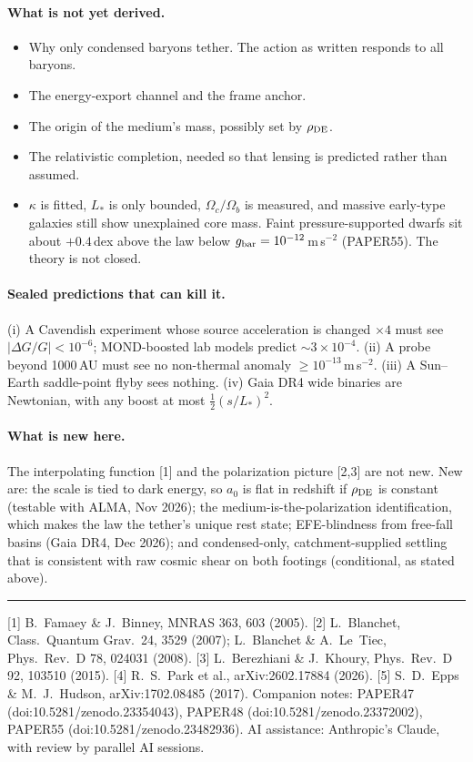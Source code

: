 \documentclass[10pt]{article}
\begin{document}
\paragraph{What is not yet derived.}
\begin{itemize}
\item Why only condensed baryons tether. The action as written responds to all baryons.
\item The energy-export channel and the frame anchor.
\item The origin of the medium's mass, possibly set by $\rho_{\rm DE}$.
\item The relativistic completion, needed so that lensing is predicted rather than assumed.
\item $\kappa$ is fitted, $L_*$ is only bounded, $\Omega_c/\Omega_b$ is measured, and massive early-type galaxies still show unexplained core mass. Faint pressure-supported dwarfs sit about $+0.4$\,dex above the law below $g_{\rm bar}=10^{-12}$\,m\,s$^{-2}$ (PAPER55). The theory is not closed.
\end{itemize}

\paragraph{Sealed predictions that can kill it.} (i) A Cavendish experiment whose source acceleration is changed $\times4$ must see $|\Delta G/G|<10^{-6}$; MOND-boosted lab models predict $\sim3\times10^{-4}$. (ii) A probe beyond 1000\,AU must see no non-thermal anomaly $\ge10^{-13}$\,m\,s$^{-2}$. (iii) A Sun--Earth saddle-point flyby sees nothing. (iv) Gaia DR4 wide binaries are Newtonian, with any boost at most $\tfrac12(s/L_*)^2$.

\paragraph{What is new here.} The interpolating function [1] and the polarization picture [2,3] are not new. New are: the scale is tied to dark energy, so $a_0$ is flat in redshift if $\rho_{\rm DE}$ is constant (testable with ALMA, Nov 2026); the medium-is-the-polarization identification, which makes the law the tether's unique rest state; EFE-blindness from free-fall basins (Gaia DR4, Dec 2026); and condensed-only, catchment-supplied settling that is consistent with raw cosmic shear on both footings (conditional, as stated above).

\vspace{4pt}\hrule\vspace{3pt}
{\footnotesize [1] B.~Famaey \& J.~Binney, MNRAS 363, 603 (2005). [2] L.~Blanchet, Class.\ Quantum Grav.\ 24, 3529 (2007); L.~Blanchet \& A.~Le~Tiec, Phys.\ Rev.\ D 78, 024031 (2008). [3] L.~Berezhiani \& J.~Khoury, Phys.\ Rev.\ D 92, 103510 (2015). [4] R.~S.~Park et al., arXiv:2602.17884 (2026). [5] S.~D.~Epps \& M.~J.~Hudson, arXiv:1702.08485 (2017). Companion notes: PAPER47 (doi:10.5281/zenodo.23354043), PAPER48 (doi:10.5281/zenodo.23372002), PAPER55 (doi:10.5281/zenodo.23482936). AI assistance: Anthropic's Claude, with review by parallel AI sessions.}
\end{document}
